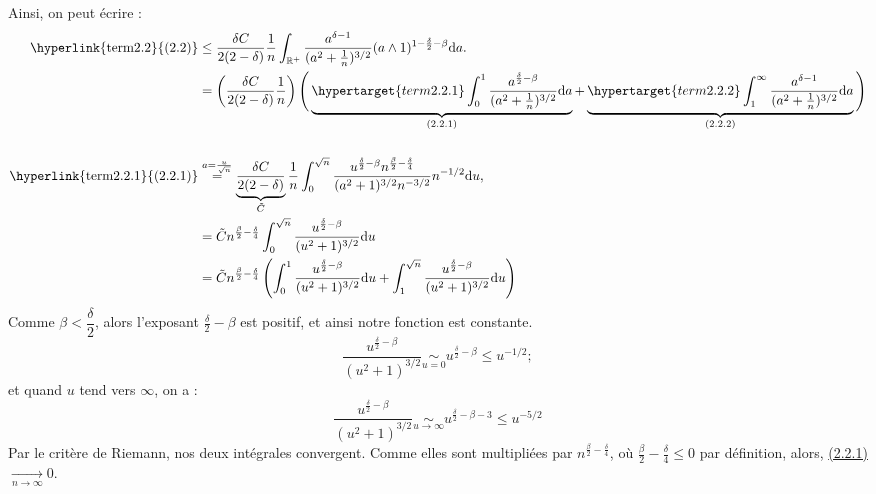 \documentclass[openany]{book}
\makeatletter
\newcommand{\R}{\mathbb{R}}
\newcommand{\1}{\mathbbm{1}}
\renewcommand{\d}{\mathrm{d}}
\renewenvironment{proof}[1][\textbf{\textit{Démonstration}}]{%
  \par\pushQED{\qed}%
  \normalfont\topsep6\p@\@plus6\p@\relax
  \trivlist\item[\hskip\labelsep
    #1\@addpunct{.}]\ignorespaces
}{%
  \popQED\endtrivlist\@endpefalse
}
\theoremstyle{thmfont}
\theoremstyle{deffont}
\theoremstyle{thmfont}
\theoremstyle{deffont}
\makeatother
\begin{document}
\begin{proof}
    \noindent Ainsi, on peut écrire :
    \begin{align*}
      \text{\hyperlink{term2.2}{(2.2)}} &\leq \dfrac{\delta C}{2(2-\delta)}\dfrac{1}{n} \int_{\R^+} \dfrac{a^{\delta-1}}{(a^2 + \frac{1}{n})^{3/2}}(a \wedge 1)^{1-\frac{\delta}{2} - \beta} \d a.\\
              &= \left(\dfrac{\delta C}{2(2-\delta)}\dfrac{1}{n}\right)\Bigg( \underbrace{ \hypertarget{term2.2.1}\int_0^1 \dfrac{a^{\frac{\delta}{2} - \beta}}{(a^2 + \frac{1}{n})^{3/2}} \d a}_{(2.2.1)}
                + \underbrace{ \hypertarget{term2.2.2} \int_1^\infty \dfrac{a^{\delta - 1}}{(a^2 + \frac{1}{n})^{3/2}}\d a}_{(2.2.2)} \Bigg)\\  \\
      \text{\hyperlink{term2.2.1}{(2.2.1)}} &\overset{a = \frac{u}{\sqrt{n}}}{=} \underbrace{\dfrac{\delta C}{2(2-\delta)}}_{\tilde C}\dfrac{1}{n}  \int_0^{\sqrt{n}} \dfrac{u^{\frac{\delta}{2} - \beta} n^{ \frac{\beta}{2}-\frac{\delta}{4}}}{(a^2 + 1)^{3/2}n^{-3/2}} n^{-1/2}\d u,\\
              &= \tilde C n^{ \frac{\beta}{2}-\frac{\delta}{4}} \int_0^{\sqrt{n}} \dfrac{u^{\frac{\delta}{2} - \beta} }{(u^2 + 1)^{3/2}}\d u\\
              &= \tilde C n^{ \frac{\beta}{2}-\frac{\delta}{4}} \left( \int_0^1 \dfrac{u^{\frac{\delta}{2} - \beta}}{(u^2 + 1)^{3/2}}\d u + \int_1^{\sqrt{n}}\dfrac{u^{\frac{\delta}{2} - \beta}}{(u^2 + 1)^{3/2}}\d u\right)
    \end{align*}
    Comme $\beta<\dfrac{\delta}{2}$, alors l'exposant $\frac{\delta}{2} - \beta$ est positif, et ainsi notre fonction est constante.
    $$\dfrac{u^{\frac{\delta}{2} - \beta}}{(u^2 + 1)^{3/2}} \underset{u = 0}{\sim} u^{\frac{\delta}{2} - \beta} \leq u^{-1/2};$$
    et quand $u$ tend vers $\infty$, on a :
    $$\dfrac{u^{\frac{\delta}{2} - \beta}}{(u^2 + 1)^{3/2}} \underset{u \to \infty}{\sim} u^{\frac{\delta}{2} -\beta -3} \leq u^{-5/2}$$
    Par le critère de Riemann, nos deux intégrales convergent. Comme elles sont multipliées par $n^{ \frac{\beta}{2}-\frac{\delta}{4}}$, où $\frac{\beta}{2}-\frac{\delta}{4} \leq 0$ par définition, alors, \hyperlink{term2.2.1}{(2.2.1)}$\xrightarrow[n \to \infty]{} 0$.


\end{proof}
\end{document}
